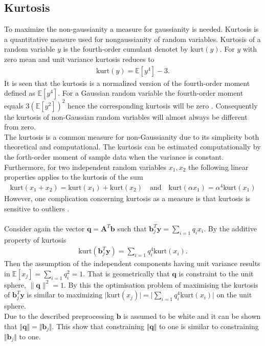 \subsection{Kurtosis}
To maximize the non-gaussianity a measure for gaussianity is needed. Kurtosis is a quantitative measure used for nongaussianity of random variables. Kurtosis of a random variable $y$ is the fourth-order cumulant denotet by $\text{kurt}(y)$. For $y$ with zero mean and unit variance kurtosis reduces to 
\begin{align*}
\text{kurt} (y) = \mathbb{E}[y^4] - 3.
\end{align*} 
It is seen that the kurtosis is a normalized version of the fourth-order moment defined as $\mathbb{E}[y^4]$. 
For a Gaussian random variable the fourth-order moment equals $3(\mathbb{E}[y^2])^2$ hence the corresponding kurtosis will be zero \cite[p. 171]{ICA}. Consequently the kurtosis of non-Gaussian random variables will almost always be different from zero.\\
The kurtosis is a common measure for non-Gaussianity due to its simplicity  both theoretical and computational. The kurtosis can be estimated computationally by the forth-order moment of sample data when the variance is constant.
Furthermore, for two independent random variables $x_1, x_2$ the following linear properties applies to the kurtosis of the sum
\begin{align*}
\text{kurt}(x_1 + x_2)=\text{kurt}(x_1)+ \text{kurt}(x_2) \quad \text{and} \quad \text{kurt}(\alpha x_1) = \alpha^4 \text{kurt}(x_1)
\end{align*}  
However, one complication concerning kurtosis as a measure is that kurtosis is sensitive to outliers \cite[p. 182]{ICA}.\\ 
\\      
Consider again the vector $\textbf{q} = \textbf{A}^T\textbf{b}$ such that $\textbf{b}_{j}^T \textbf{y} = \sum_{i=1}q_ix_i$. 
By the additive property of kurtosis
\begin{align*}
\text{kurt}\left( \textbf{b}_{j}^T \textbf{y}\right) = \sum_{i=1}q_i^4\text{kurt}(x_i).
\end{align*}
Then the assumption of the independent components having unit variance results in $\mathbb{E}[x_j]= \sum_{i=1}q_i^2=1$. That is geometrically that $\textbf{q}$ is constraint to the unit sphere, $\| \textbf{q}\|^2 = 1$. By this the optimisation problem of maximising the kurtosis of $\textbf{b}_{j}^T \textbf{y}$ is similar to maximizing $\vert \text{kurt}(x_j)\vert = \vert \sum_{i=1}q_i^4\text{kurt}(x_i) \vert $ on the unit sphere.\\
Due to the described preprocessing $\textbf{b}$ is assumed to be white and it can be shown that $\Vert \textbf{q} \Vert = \Vert \textbf{b}_j \Vert $\cite[p. 174]{ICA}. This show that constraining   $\Vert \textbf{q} \Vert$ to one is similar to constraining $\Vert \textbf{b}_j \Vert$ to one. 

